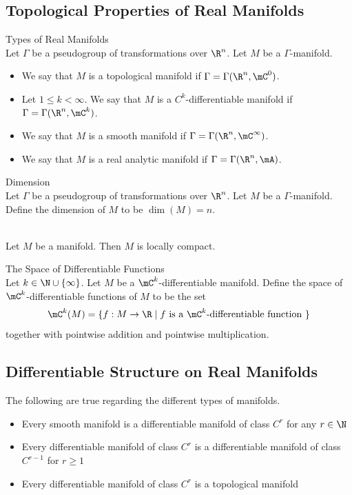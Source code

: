 \documentclass[a4paper]{article}
\begin{document}
\subsection{Topological Properties of Real Manifolds}
\begin{defn}{Types of Real Manifolds}{}\\
Let $\Gamma$ be a pseudogroup of transformations over $\R^n$. Let $M$ be a $\Gamma$-manifold. 
\begin{itemize}
\item We say that $M$ is a topological manifold if $\Gamma=\Gamma(\R^n,\mC^0)$. 
\item Let $1\leq k<\infty$. We say that $M$ is a $C^k$-differentiable manifold if $\Gamma=\Gamma(\R^n,\mC^k)$. 
\item We say that $M$ is a smooth manifold if $\Gamma=\Gamma(\R^n,\mC^\infty)$. 
\item We say that $M$ is a real analytic manifold if $\Gamma=\Gamma(\R^n,\mA)$. 
\end{itemize}
\end{defn}

\begin{defn}{Dimension}{}\\
Let $\Gamma$ be a pseudogroup of transformations over $\R^n$. Let $M$ be a $\Gamma$-manifold. Define the dimension of $M$ to be $\dim(M)=n$. 
\end{defn}

\begin{lmm}{}{}\\
Let $M$ be a manifold. Then $M$ is locally compact. 
\end{lmm}

\begin{defn}{The Space of Differentiable Functions}{}\\
Let $k\in\N\cup\{\infty\}$. Let $M$ be a $\mC^k$-differentiable manifold. Define the space of $\mC^k$-differentiable functions of $M$ to be the set $$\mC^k(M)=\{f:M\to\R\;|\;f\text{ is a }\mC^k\text{-differentiable function }\}$$ together with pointwise addition and pointwise multiplication. 
\end{defn}

\subsection{Differentiable Structure on Real Manifolds}
\begin{lmm}{}{} The following are true regarding the different types of manifolds. 
\begin{itemize}
\item Every smooth manifold is a differentiable manifold of class $C^r$ for any $r\in\N$
\item Every differentiable manifold of class $C^r$ is a differentiable manifold of class $C^{r-1}$ for $r\geq 1$
\item Every differentiable manifold of class $C^r$ is a topological manifold
\end{itemize}
\end{lmm}
\end{document}
